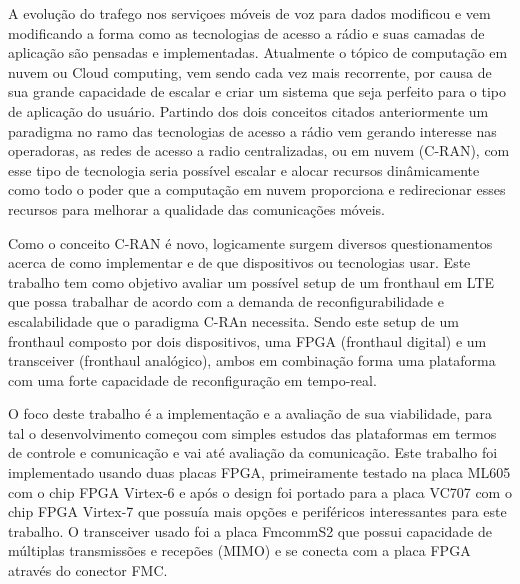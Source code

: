 \documentclass{ufpatcc}
\begin{document}
\tableofcontents    \clearpage


\begin{ufpaResumo}

A evolu\c{c}\~{a}o do trafego nos servi\c{c}oes m\'{o}veis de voz para dados
modificou e vem modificando a forma como as tecnologias de acesso a r\'{a}dio e
suas camadas de aplica\c{c}\~{a}o s\~{a}o pensadas e implementadas. Atualmente o
t\'{o}pico de computa\c{c}\~{a}o em nuvem ou Cloud computing, vem sendo cada vez
mais recorrente, por causa de sua grande capacidade de escalar e criar um
sistema que seja perfeito para o tipo de aplica\c{c}\~{a}o do usu\'{a}rio.
Partindo dos dois conceitos citados anteriormente um paradigma no ramo das
tecnologias de acesso a r\'{a}dio vem gerando interesse nas operadoras, as redes
de acesso a radio centralizadas, ou em nuvem (C-RAN), com esse tipo de
tecnologia seria poss\'{i}vel escalar e alocar recursos dinâmicamente como todo
o poder que a computa\c{c}\~{a}o em nuvem proporciona e redirecionar esses
recursos para melhorar a qualidade das comunica\c{c}\~{o}es m\'{o}veis.

Como o conceito C-RAN \'{e} novo, logicamente surgem diversos questionamentos
acerca de como implementar e de que dispositivos ou tecnologias usar. Este
trabalho tem como objetivo avaliar um poss\'{i}vel setup de um fronthaul em LTE
que possa trabalhar de acordo com a demanda de reconfigurabilidade e
escalabilidade que o paradigma C-RAn necessita. Sendo este setup de um fronthaul
composto por dois dispositivos, uma FPGA (fronthaul digital) e um transceiver
(fronthaul anal\'{o}gico), ambos em combina\c{c}\~{a}o forma uma plataforma com
uma forte capacidade de reconfigura\c{c}\~{a}o em tempo-real.

O foco deste trabalho \'{e} a implementa\c{c}\~{a}o e a avalia\c{c}\~{a}o de sua
viabilidade, para tal o desenvolvimento come\c{c}ou com simples estudos das
plataformas em termos de controle e comunica\c{c}\~{a}o e vai at\'{e}
avalia\c{c}\~{a}o da comunica\c{c}\~{a}o. Este trabalho foi implementado usando
duas placas FPGA, primeiramente testado na placa ML605 com o chip FPGA Virtex-6
e ap\'{o}s o design foi portado para a placa VC707 com o chip FPGA Virtex-7 que
possu\'{i}a mais op\c{c}\~{o}es e perif\'{e}ricos interessantes para este
trabalho. O transceiver usado foi a placa FmcommS2 que possui capacidade de
múltiplas transmiss\~{o}es e recep\~{o}es (MIMO) e se conecta com a placa FPGA
atrav\'{e}s do conector FMC.


\end{ufpaResumo}
\end{document}
